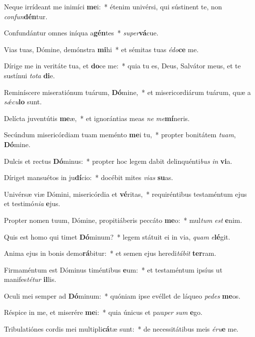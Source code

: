 \item Neque irrídeant me inimíci \textbf{me}i:~* étenim univérsi, qui sústinent te, non \textit{con}\textit{fun}\textbf{dén}tur.
\item Confundántur omnes iníqua a\textbf{gén}tes~* \textit{su}\textit{per}\textbf{vá}cue.
\item Vias tuas, Dómine, demónstra \textbf{mi}hi~* et sémitas tuas \textit{é}\textit{do}\textbf{ce} me.
\item Dírige me in veritáte tua, et \textbf{do}ce me:~* quia tu es, Deus, Salvátor meus, et te sustínui \textit{to}\textit{ta} \textbf{di}e.
\item Reminíscere miseratiónum tuárum, \textbf{Dó}mine,~* et misericordiárum tuárum, quæ a \textit{sǽ}\textit{cu}\textbf{lo} sunt.
\item Delícta juventútis \textbf{me}æ,~* et ignorántias meas \textit{ne} \textit{me}\textbf{mí}neris.
\item Secúndum misericórdiam tuam meménto \textbf{me}i tu,~* propter bonitátem \textit{tu}\textit{am}, \textbf{Dó}mine.
\item Dulcis et rectus \textbf{Dó}minus:~* propter hoc legem dabit delinquénti\textit{bus} \textit{in} \textbf{vi}a.
\item Díriget mansuétos in ju\textbf{dí}cio:~* docébit mites \textit{vi}\textit{as} \textbf{su}as.
\item Univérsæ viæ Dómini, misericórdia et \textbf{vé}ritas,~* requiréntibus testaméntum ejus et testimó\textit{ni}\textit{a} \textbf{e}jus.
\item Propter nomen tuum, Dómine, propitiáberis peccáto \textbf{me}o:~* mul\textit{tum} \textit{est} \textbf{e}nim.
\item Quis est homo qui timet \textbf{Dó}minum?~* legem státuit ei in via, \textit{quam} \textit{e}\textbf{lé}git.
\item Anima ejus in bonis demo\textbf{rá}bitur:~* et semen ejus heredi\textit{tá}\textit{bit} \textbf{ter}ram.
\item Firmaméntum est Dóminus timéntibus \textbf{e}um:~* et testaméntum ipsíus ut manifes\textit{té}\textit{tur} \textbf{il}lis.
\item Oculi mei semper ad \textbf{Dó}minum:~* quóniam ipse evéllet de láqueo \textit{pe}\textit{des} \textbf{me}os.
\item Réspice in me, et miserére \textbf{me}i:~* quia únicus et pau\textit{per} \textit{sum} \textbf{e}go.
\item Tribulatiónes cordis mei multipli\textbf{cá}tæ sunt:~* de necessitátibus meis \textit{é}\textit{ru}\textbf{e} me.
